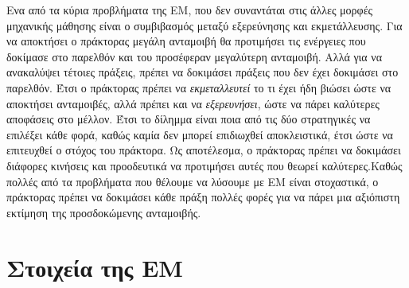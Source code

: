 Ενα από τα κύρια προβλήματα της ΕΜ, που δεν συναντάται στις άλλες μορφές μηχανικής μάθησης είναι
ο συμβιβασμός μεταξύ εξερεύνησης και εκμετάλλευσης. Για να αποκτήσει ο πράκτορας μεγάλη ανταμοιβή
θα προτιμήσει τις ενέργειες που δοκίμασε στο παρελθόν και του προσέφεραν μεγαλύτερη ανταμοιβή. Αλλά
για να ανακαλύψει τέτοιες πράξεις, πρέπει να δοκιμάσει πράξεις που δεν έχει δοκιμάσει στο παρελθόν.
Έτσι ο πράκτορας πρέπει να \textit{εκμεταλλευτεί} το τι έχει ήδη βιώσει ώστε να αποκτήσει ανταμοιβές,
αλλά πρέπει και να \textit{εξερευνήσει}, ώστε να πάρει καλύτερες αποφάσεις στο μέλλον. Έτσι το δίλημμα
είναι ποια από τις δύο στρατηγικές να επιλέξει κάθε φορά, καθώς καμία δεν μπορεί επιδιωχθεί αποκλειστικά,
έτσι ώστε να επιτευχθεί ο στόχος του πράκτορα. Ως αποτέλεσμα, ο πράκτορας πρέπει να δοκιμάσει διάφορες
κινήσεις και προοδευτικά να προτιμήσει αυτές που θεωρεί καλύτερες.Καθώς πολλές από τα προβλήματα που
θέλουμε να λύσουμε με ΕΜ είναι στοχαστικά, ο πράκτορας πρέπει να δοκιμάσει κάθε πράξη πολλές φορές
για να πάρει μια αξιόπιστη εκτίμηση της προσδοκώμενης ανταμοιβής.


\section{Στοιχεία της ΕΜ}

